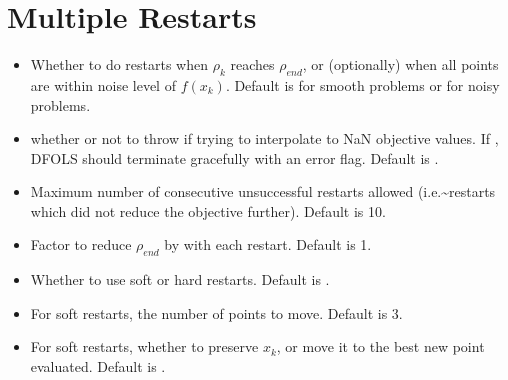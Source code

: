 \documentclass[letterpaper,10pt,english]{sphinxmanual}
\begin{document}
\section{Multiple Restarts}
\label{\detokenize{advanced:multiple-restarts}}\begin{itemize}
\item {} 
\sphinxAtStartPar
{} \sphinxhyphen{} Whether to do restarts when \(\rho_k\) reaches \(\rho_{end}\), or (optionally) when all points are within noise level of \(f(x_k)\). Default is  for smooth problems or  for noisy problems.

\item {} 
\sphinxAtStartPar
{} \sphinxhyphen{} whether or not to throw  if trying to interpolate to NaN objective values. If , DFO\sphinxhyphen{}LS should terminate gracefully with an error flag. Default is .

\item {} 
\sphinxAtStartPar
{} \sphinxhyphen{} Maximum number of consecutive unsuccessful restarts allowed (i.e.\textasciitilde{}restarts which did not reduce the objective further). Default is 10.

\item {} 
\sphinxAtStartPar
{} \sphinxhyphen{} Factor to reduce \(\rho_{end}\) by with each restart. Default is 1.

\item {} 
\sphinxAtStartPar
{} \sphinxhyphen{} Whether to use soft or hard restarts. Default is .

\item {} 
\sphinxAtStartPar
{} \sphinxhyphen{} For soft restarts, the number of points to move. Default is 3.

\item {} 
\sphinxAtStartPar
{} \sphinxhyphen{} For soft restarts, whether to preserve \(x_k\), or move it to the best new point evaluated. Default is .


\end{itemize}
\end{document}
